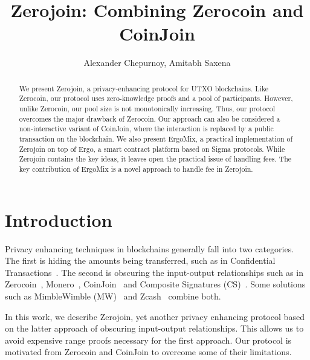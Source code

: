 \documentclass[runningheads]{llncs}
\newcommand{\mixname}{ErgoMix\xspace}
\newcommand{\zerocoin}{Zerocoin\xspace}
\begin{document}
\newcommand{\algname}{Zerojoin\xspace}
\title{\algname: Combining \zerocoin and CoinJoin}

\author{Alexander Chepurnoy, Amitabh Saxena}


\maketitle

\begin{abstract}

We present \algname, a privacy-enhancing protocol for UTXO blockchains. 
Like \zerocoin, our protocol uses zero-knowledge proofs and a pool of
participants. However, unlike \zerocoin, our pool size is not monotonically increasing.
Thus, our protocol overcomes the major drawback of \zerocoin. Our approach can also be considered a non-interactive variant of CoinJoin, where the interaction is replaced by a public transaction on the blockchain. We also present \mixname, a practical implementation of \algname on top of Ergo, a smart contract platform based on Sigma protocols. While \algname contains the key ideas, it leaves open the practical issue of handling fees. The key contribution of \mixname is a novel approach to handle fee in \algname. 

\end{abstract}

\section{Introduction}
\label{intro}

Privacy enhancing techniques in blockchains generally fall into two categories. The first is hiding the amounts being transferred, such as in Confidential Transactions~\cite{ct}. The second is obscuring the input-output relationships such as in \zerocoin~\cite{zerocoin}, Monero~\cite{monero}, CoinJoin~\cite{coinjoin} and Composite Signatures (CS)~\cite{composite}. Some solutions such as MimbleWimble (MW)~\cite{mw} and Zcash~\cite{zcash,zcash1} combine both.

In this work, we describe \algname, yet another privacy enhancing protocol based on the latter approach of obscuring input-output relationships. This allows us to avoid expensive range proofs necessary for the first approach. Our protocol is motivated from \zerocoin and CoinJoin to overcome some of their limitations.
\end{document}
